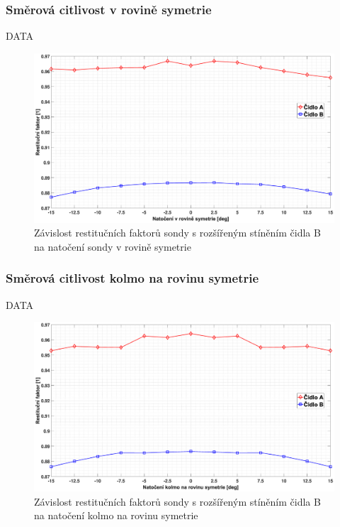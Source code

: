         \subsubsection{Směrová citlivost v rovině symetrie}
            DATA
            
            \begin{figure}[ht!]
                \centering
                \includegraphics*[width=\textwidth, trim={5.9cm 1.0cm 5.8cm 2.0cm}]{400_SIMULACE_KONSTRUKCNICH_UPRAV/Grafy/03_rovina_symetrie}
                \caption{Závislost restitučních faktorů sondy s rozšířeným stíněním čidla B na natočení sondy v rovině symetrie}
                \label{fig:sonda-s-rosirenym-stinenim-rovina-symetrie}
            \end{figure}
        \subsubsection{Směrová citlivost kolmo na rovinu symetrie}
            DATA
            
             \begin{figure}[ht!]
                \centering
                \includegraphics*[width=\textwidth, trim={5.9cm 1.0cm 5.8cm 2.0cm}]{400_SIMULACE_KONSTRUKCNICH_UPRAV/Grafy/03_kolma_rovina}
                \caption{Závislost restitučních faktorů sondy s rozšířeným stíněním čidla B na natočení kolmo na rovinu symetrie}
                \label{fig:sonda-s-rosirenym-stinenim-kolma-rovina}
            \end{figure}
        
